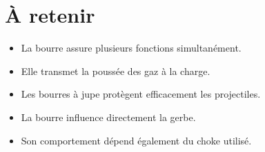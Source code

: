 \section{À retenir}

\begin{aretenir}

\begin{itemize}
    \item La bourre assure plusieurs fonctions simultanément.
    \item Elle transmet la poussée des gaz à la charge.
    \item Les bourres à jupe protègent efficacement les projectiles.
    \item La bourre influence directement la gerbe.
    \item Son comportement dépend également du choke utilisé.
\end{itemize}

\end{aretenir}
